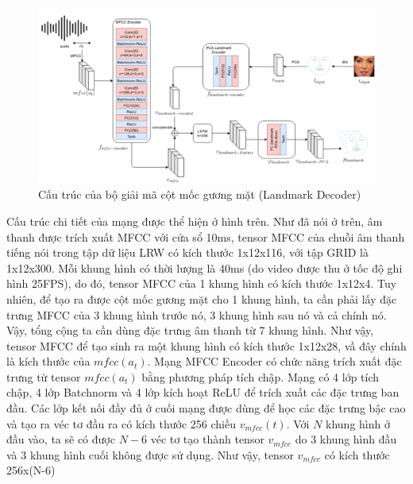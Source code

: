 \begin{figure}[H]
    \centering
    \includegraphics[width=15cm]{./content/materials/landmark_decoder.png}
    \caption{Cấu trúc của bộ giải mã cột mốc gương mặt (Landmark Decoder)}
\end{figure}

Cấu trúc chi tiết của mạng được thể hiện ở hình trên. Như đã nói ở trên, âm thanh được trích xuất MFCC với cửa sổ 10ms, tensor MFCC của chuỗi âm thanh tiếng nói trong tập dữ liệu LRW có kích thước 1x12x116, với tập GRID là 1x12x300. Mỗi khung hình có thời lượng là 40ms (do video được thu ở tốc độ ghi hình 25FPS), do đó, tensor MFCC của 1 khung hình có kích thước 1x12x4. Tuy nhiên, để tạo ra được cột mốc gương mặt cho 1 khung hình, ta cần phải lấy đặc trưng MFCC của 3 khung hình trước nó, 3 khung hình sau nó và cả chính nó. Vậy, tổng cộng ta cần dùng đặc trưng âm thanh từ 7 khung hình. Như vậy, tensor MFCC để tạo sinh ra một khung hình có kích thước 1x12x28, vầ đây chính là kích thước của $mfcc(a_t)$. Mạng MFCC Encoder có chức năng trích xuất đặc trưng từ tensor $mfcc(a_t)$ bằng phương pháp tích chập. Mạng có 4 lớp tích chập, 4 lớp Batchnorm và 4 lớp kích hoạt ReLU để trích xuất các đặc trưng ban đầu. Các lớp kết nối đầy đủ ở cuối mạng được dùng để học các đặc trưng bậc cao và tạo ra véc tơ đầu ra có kích thước 256 chiều $v_{mfcc}(t)$. Với $N$ khung hình ở đầu vào, ta sẽ có được $N-6$ véc tơ tạo thành tensor $v_{mfcc}$ do 3 khung hình đầu và 3 khung hình cuối không được sử dụng. Như vậy, tensor $v_{mfcc}$ có kích thước 256x(N-6)

